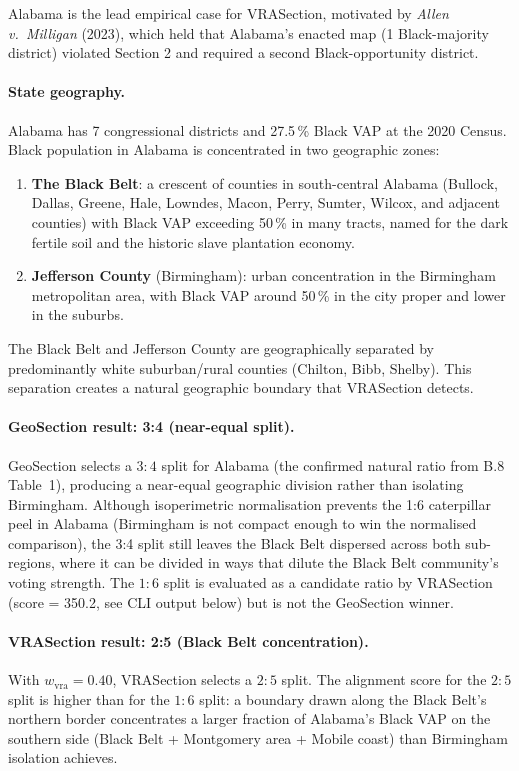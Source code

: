Alabama is the lead empirical case for VRASection, motivated by
\emph{Allen v.\ Milligan} (2023), which held that Alabama's enacted map
(1 Black-majority district) violated Section 2 and required a second
Black-opportunity district.

\paragraph{State geography.}
Alabama has 7 congressional districts and 27.5\,\% Black VAP at the
2020 Census.
Black population in Alabama is concentrated in two geographic zones:
\begin{enumerate}
\item \textbf{The Black Belt}: a crescent of counties in south-central Alabama
  (Bullock, Dallas, Greene, Hale, Lowndes, Macon, Perry, Sumter,
  Wilcox, and adjacent counties) with Black VAP exceeding 50\,\% in many tracts,
  named for the dark fertile soil and the historic slave plantation economy.
\item \textbf{Jefferson County} (Birmingham): urban concentration in the
  Birmingham metropolitan area, with Black VAP around 50\,\% in the city
  proper and lower in the suburbs.
\end{enumerate}
The Black Belt and Jefferson County are geographically separated by
predominantly white suburban/rural counties (Chilton, Bibb, Shelby).
This separation creates a natural geographic boundary that VRASection detects.

\paragraph{GeoSection result: 3:4 (near-equal split).}
GeoSection selects a $3:4$ split for Alabama (the confirmed natural ratio from B.8 Table~1), producing a near-equal geographic division rather than isolating Birmingham.
Although isoperimetric normalisation prevents the 1:6 caterpillar peel in Alabama
(Birmingham is not compact enough to win the normalised comparison), the 3:4 split
still leaves the Black Belt dispersed across both sub-regions,
where it can be divided in ways that dilute the Black Belt community's
voting strength.
The $1:6$ split is evaluated as a candidate ratio by VRASection (score = 350.2,
see CLI output below) but is not the GeoSection winner.

\paragraph{VRASection result: 2:5 (Black Belt concentration).}
With $w_\text{vra} = 0.40$, VRASection selects a $2:5$ split.
The alignment score for the $2:5$ split is higher than for the $1:6$ split:
a boundary drawn along the Black Belt's northern border concentrates a
larger fraction of Alabama's Black VAP on the southern side (Black Belt +
Montgomery area + Mobile coast) than Birmingham isolation achieves.

